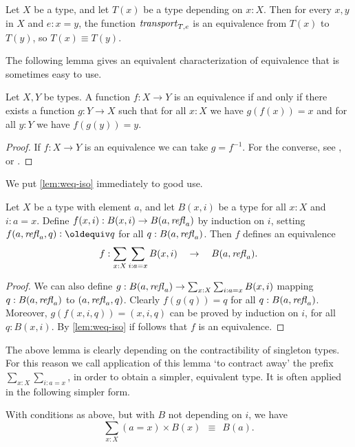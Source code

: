\begin{lemma}\label{lem:equivalence-transport}
Let $X$ be a type, and let $T(x)$ be a type depending on $x:X$.
Then for every $x,y$ in $X$ and $e: x=y$, the function $\mathord{\mathit{transport}}_{T,e}$
is an equivalence from $T(x)$ to $T(y)$, so $T(x)\equiv T(y)$.
\end{lemma}

The following lemma gives an equivalent characterization
of equivalence that is sometimes easy to use.

\begin{lemma}\label{lem:weq-iso}
Let $X,Y$ be types. A function $f: X\to Y$ is an equivalence
if and only if there exists a function $g: Y\to X$ such that
for all $x:X$ we have $g(f(x))=x$ and for all 
$y:Y$ we have $f(g(y))=y$.
\end{lemma}
\begin{proof}
If $f: X\to Y$ is an equivalence we can take $g=f^{-1}$.
For the converse, see
\cite[Chapter 4]{hottbook}, or .
\end{proof}

We put \cref{lem:weq-iso} immediately to good use.

\begin{lemma}\label{lem:contract-away}
Let $X$ be a type with element $a$, and let
$B(x,i)$ be a type for all $x:X$ and $i: a=x$.
Define $f(x,i): B(x,i) \to B(a,\mathop{{\it refl}_{a}})$ by induction on $i$,
setting $f(a,\refl{a},q) \defeq q$ for all $q:B(a,\mathop{{\it refl}_{a}})$.
Then $f$ defines an equivalence 
\[
f: \sum_{x:X} \sum_{i: a=x} B(x,i) \quad \to \quad B(a,\mathop{{\it refl}_{a}}).
\]
\end{lemma}
\begin{proof}
We can also define 
$g: B(a,\mathop{{\it refl}_{a}})\to \sum_{x:X} \sum_{i: a=x} B(x,i)$
mapping $q: B(a,\mathop{{\it refl}_{a}})$ to $(a,\mathop{{\it refl}_{a}},q)$.
Clearly $f(g(q))=q$ for all $q:B(a,\mathop{{\it refl}_{a}})$.
Moreover, $g(f(x,i,q))=(x,i,q)$ can be proved by induction
on $i$, for all $q:B(x,i)$.
By \cref{lem:weq-iso} if follows that $f$
is an equivalence.
\end{proof}

The above lemma is clearly depending on the 
contractibility of singleton types. For this reason
we call application of this lemma `to contract away'
the prefix $\sum_{x:X} \sum_{i: a=x}$, in order
to obtain a simpler, equivalent type. It is often applied
in the following simpler form.

\begin{corollary}\label{cor:contract-away}
With conditions as above, but with $B$ not depending on $i$, we have
\[
\sum_{x:X} (a=x)\times B(x) ~~\equiv~~ B(a).
\]
\end{corollary}


